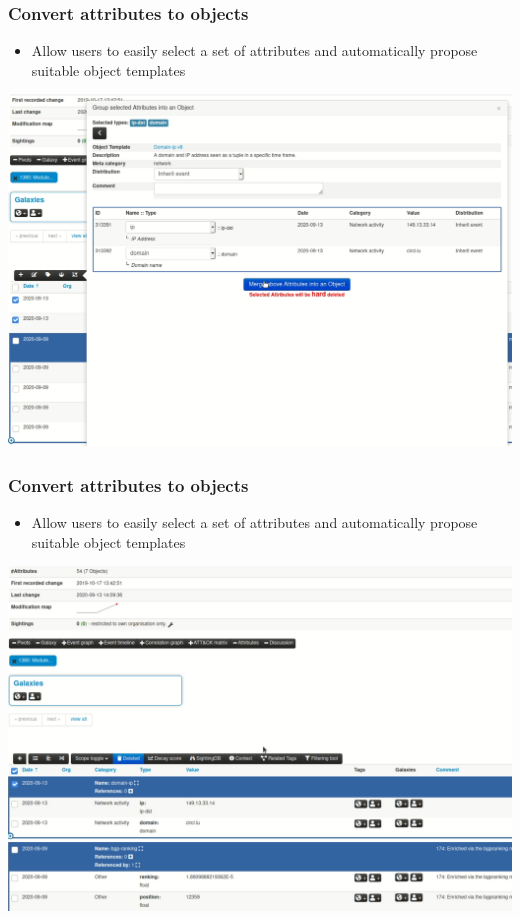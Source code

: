 \begin{frame}
\frametitle{Convert attributes to objects}
\begin{itemize}
    \item Allow users to easily select a set of attributes and automatically propose suitable object templates
\end{itemize}
\begin{center}
    \includegraphics[scale=0.15]{attributes_to_object_3.png}
\end{center}
\end{frame}

\begin{frame}
\frametitle{Convert attributes to objects}
\begin{itemize}
    \item Allow users to easily select a set of attributes and automatically propose suitable object templates
\end{itemize}
\begin{center}
    \includegraphics[scale=0.15]{attributes_to_object_4.png}
\end{center}
\end{frame}

